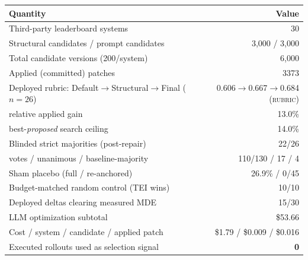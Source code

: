 \begin{tabular}{lr}
\toprule
Quantity & Value \\
\midrule
Third-party leaderboard systems & 30 \\
Structural candidates / prompt candidates & 3,000 / 3,000 \\
Total candidate versions (200/system) & 6,000 \\
Applied (committed) patches & 3373 \\
Deployed rubric: Default$\to$Structural$\to$Final ($n{=}26$) & 0.606$\to$0.667$\to$0.684 (\textsc{rubric}) \\
\quad relative applied gain & 13.0\% \\
\quad best-\emph{proposed} search ceiling & 14.0\% \\
Blinded strict majorities (post-repair) & 22/26 \\
\quad votes / unanimous / baseline-majority & 110/130 / 17 / 4 \\
Sham placebo (full / re-anchored) & 26.9\% / 0/45 \\
Budget-matched random control (TEI wins) & 10/10 \\
Deployed deltas clearing measured MDE & 15/30 \\
LLM optimization subtotal & \$53.66 \\
Cost / system \quad / candidate \quad / applied patch & \$1.79 / \$0.009 / \$0.016 \\
Executed rollouts used as selection signal & \textbf{0} \\
\bottomrule
\end{tabular}
